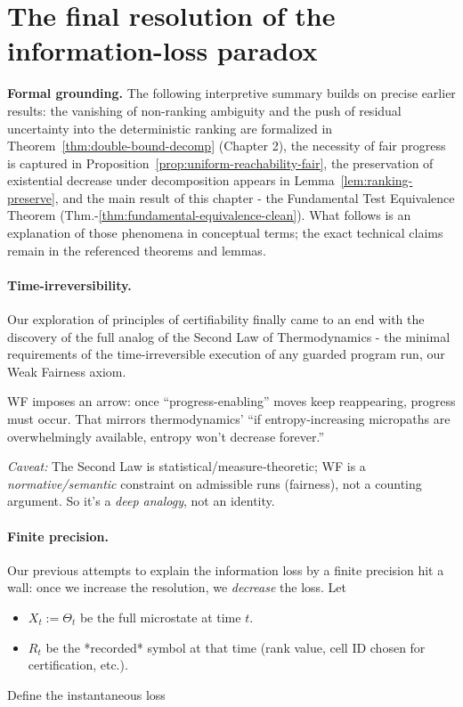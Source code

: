 \documentclass[12pt]{article}
\theoremstyle{definition}
\theoremstyle{plain}
\begin{document}
\section{The final resolution of the information-loss paradox}

\noindent\textbf{Formal grounding.}  
The following interpretive summary builds on precise earlier results: the vanishing of non-ranking ambiguity and the push of residual uncertainty into the deterministic ranking are formalized in Theorem~\ref{thm:double-bound-decomp} (Chapter 2), the necessity of fair progress is captured in Proposition~\ref{prop:uniform-reachability-fair}, the preservation of existential decrease under decomposition appears in Lemma~\ref{lem:ranking-preserve}, and the main result of this chapter - the Fundamental Test Equivalence Theorem (Thm.-\ref{thm:fundamental-equivalence-clean}). What follows is an explanation of those phenomena in conceptual terms; the exact technical claims remain in the referenced theorems and lemmas.


\paragraph{Time-irreversibility.} Our exploration of principles of certifiability finally came to an end with the discovery of the full analog of the Second Law of Thermodynamics - the minimal requirements of the time-irreversible execution of any guarded program run, our Weak Fairness axiom.

WF imposes an arrow: once “progress-enabling” moves keep reappearing, progress must occur. That mirrors thermodynamics’ “if entropy‑increasing micropaths are overwhelmingly available, entropy won’t decrease forever.”

\textit{Caveat:} The Second Law is statistical/measure‑theoretic; WF is a \emph{normative/semantic} constraint on admissible runs (fairness), not a counting argument. So it’s a \emph{deep analogy}, not an identity.
\paragraph{Finite precision.} Our previous attempts to explain the information loss by a finite precision hit a wall: once we increase the resolution, we \emph{decrease} the loss.
Let
\begin{itemize}
    \item $X_t:=\Theta_t$ be the full microstate at time $t$.
    \item $R_t$ be the *recorded* symbol at that time (rank value, cell ID chosen for certification, etc.).
\end{itemize}
Define the instantaneous loss
\end{document}
